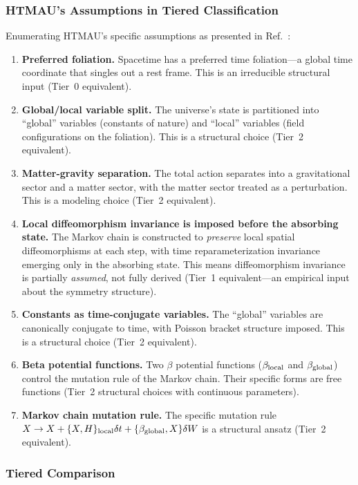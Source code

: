\documentclass[aps,prd,twocolumn,showpacs,superscriptaddress,preprintnumbers]{revtex4-2}
\begin{document}
\subsubsection{HTMAU's Assumptions in Tiered Classification}

Enumerating HTMAU's specific assumptions as presented in Ref.~\cite{Bassani:2025htma}:

\begin{enumerate}
    \item \textbf{Preferred foliation.} Spacetime has a preferred time foliation---a global time coordinate that singles out a rest frame. This is an irreducible structural input (Tier~0 equivalent).
    \item \textbf{Global/local variable split.} The universe's state is partitioned into ``global'' variables (constants of nature) and ``local'' variables (field configurations on the foliation). This is a structural choice (Tier~2 equivalent).
    \item \textbf{Matter-gravity separation.} The total action separates into a gravitational sector and a matter sector, with the matter sector treated as a perturbation. This is a modeling choice (Tier~2 equivalent).
    \item \textbf{Local diffeomorphism invariance is imposed before the absorbing state.} The Markov chain is constructed to \emph{preserve} local spatial diffeomorphisms at each step, with time reparameterization invariance emerging only in the absorbing state. This means diffeomorphism invariance is partially \emph{assumed}, not fully derived (Tier~1 equivalent---an empirical input about the symmetry structure).
    \item \textbf{Constants as time-conjugate variables.} The ``global'' variables are canonically conjugate to time, with Poisson bracket structure imposed. This is a structural choice (Tier~2 equivalent).
    \item \textbf{Beta potential functions.} Two $\beta$ potential functions ($\beta_{\rm local}$ and $\beta_{\rm global}$) control the mutation rule of the Markov chain. Their specific forms are free functions (Tier~2 structural choices with continuous parameters).
    \item \textbf{Markov chain mutation rule.} The specific mutation rule $X\to X+\{X,H\}_{\rm local}\delta t + \{\beta_{\rm global},X\}\delta W$ is a structural ansatz (Tier~2 equivalent).
\end{enumerate}

\subsubsection{Tiered Comparison}
\end{document}
